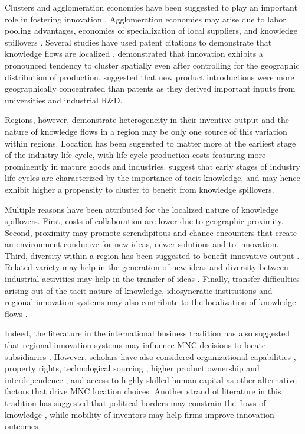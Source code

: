 \documentclass[12pt,letterpaper]{article}
\begin{document}
Clusters and agglomeration economies have been suggested to play an important role in fostering innovation \citep{Marshall1890, Porter1990}. Agglomeration economies may arise due to labor pooling advantages, economies of specialization of local suppliers, and knowledge spillovers \citep{Porter1990, Krugman1991a}.  Several studies have used patent citations to demonstrate that knowledge flows are localized \citep{Jaffe1993, Almeida1999}. \cite{Audretsch1996a} demonstrated that innovation exhibits a pronounced tendency to cluster spatially even after controlling for the geographic distribution of production. \cite*{Acs1994} suggested that new product introductions were more geographically concentrated than patents as  they derived important inputs from universities and industrial R\&D. \par

Regions, however, demonstrate heterogeneity in their inventive output \citep*{Agrawal2014b} and the nature of knowledge flows in a region may be only one source of this variation within regions. Location has been suggested to matter more at the earliest stage of the industry life cycle, with life-cycle production costs featuring more prominently in mature goods and industries. \cite{Audretsch1996b} suggest that early stages of  industry life cycles are characterized by the importance of tacit knowledge, and may hence exhibit higher a propensity to cluster to benefit from knowledge spillovers. \par

Multiple reasons have been attributed for the localized nature of knowledge spillovers. First, costs of collaboration are lower due to geographic proximity. Second, proximity may promote serendipitous and chance encounters that create an environment conducive for new ideas, newer solutions and to innovation. Third, diversity within a region has been suggested to benefit innovative output \citep{Feldman1999}. Related variety \citep*{Boschma2009, Frenken2007} may help in the generation of new ideas and diversity between industrial activities may help in the transfer of ideas \citep{Jacobs1969}. Finally, transfer difficulties arising out of the tacit nature of knowledge, idiosyncratic institutions and regional innovation systems may also contribute to the localization of knowledge flows  \citep{Cooke1996, Maskell1999, Howells1996, Howells2002}.

Indeed, the literature in the international business tradition has also suggested that regional innovation systems may influence MNC decisions to locate subsidiaries \citep{Andersen2005}. However, scholars have also considered organizational capabilities \citep{Zhao2006}, property rights, technological sourcing \citep{Florida1997}, higher product ownership and interdependence \citep{Pearce1999}, and access to highly skilled human capital as other alternative factors that drive MNC location choices. Another strand of literature in this tradition has suggested that political borders  may constrain the flows of knowledge \citep{Singh2013}, while mobility of inventors may help firms improve innovation outcomes \citep*{Alnuaimi2012b}.
\end{document}
